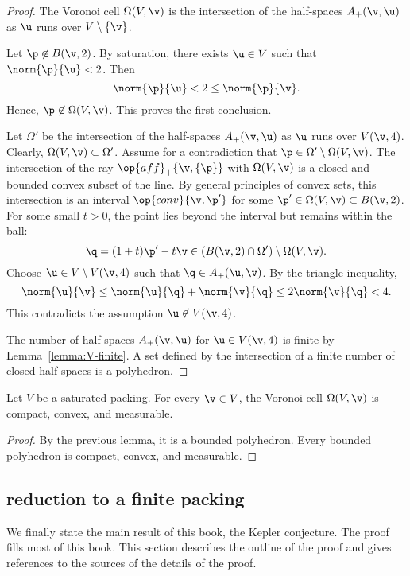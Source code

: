 \begin{proof} 
The Voronoi cell $\Omega(V,\v)$ is the
intersection of the half-spaces $A_+(\v,\u)$ as $\u$ runs over
$V\setminus \{\v\}$.

Let $\p\not\in B(\v,2)$.  
By saturation, there exists $\u\in V$ such that $\norm{\p}{\u}<2$.
Then 
\[  
\norm{\p}{\u} < 2 \le \norm{\p}{\v}.
\] 
Hence, $\p\not\in\Omega(V,\v)$.  This proves the first conclusion.


Let $\Omega'$ be the intersection of the half-spaces $A_+(\v,\u)$ as
$\u$ runs over $V(\v,4)$.  Clearly, $\Omega(V,\v)\subset \Omega'$.
Assume for a contradiction that $\p\in \Omega'\setminus\Omega(V,\v)$.
The intersection of the ray $\op{aff}_+\{\v,\{\p\}\}$ with
$\Omega(V,\v)$ is a closed and bounded convex subset of the line.  By
general principles of convex sets, this intersection is an interval
$\op{conv}\{\v,\p'\}$ for some $\p'\in\Omega(V,\v)\subset B(\v,2)$.
For some small $t>0$, the point lies beyond the interval but remains
within the ball:
\[  
\q = (1+t)\p' -t \v\in (B(\v,2)\cap \Omega')\setminus \Omega(V,\v).
\] 
Choose $\u\in V\setminus V(\v,4)$ such that $\q\in A_+(\u,\v)$.  By the
triangle inequality,
\[  
\norm{\u}{\v} \le \norm{\u}{\q} + \norm{\v}{\q} \le 2\norm{\v}{\q} < 4.
\] 
This contradicts the assumption $\u\not\in V(\v,4)$.

The number of half-spaces $A_+(\v,\u)$ for $\u\in V(\v,4)$ is finite by
Lemma~\ref{lemma:V-finite}.  A set defined by the intersection of a finite number
of closed half-spaces is a polyhedron.
\end{proof}

\begin{lemma}
Let $ V$ be a saturated packing.  For every $\v\in  V$, 
the Voronoi cell $\Omega( V,\v)$  is
compact, convex, and measurable.
\end{lemma}

\begin{proof} By the previous lemma, it is a bounded polyhedron.
  Every bounded polyhedron is compact, convex, and measurable.
\end{proof}




\subsection{reduction to a finite packing}

We finally state the main result of this book, the Kepler conjecture.
The proof fills most of this book. This section describes the
outline of the proof and gives references to the sources of the
details of the proof.


